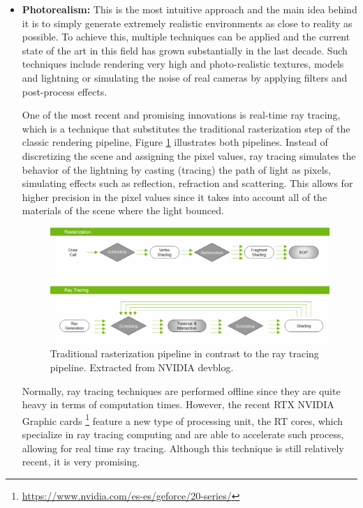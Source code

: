 \begin{itemize}
	\item \textbf{Photorealism:} This is the most intuitive approach and the main idea behind it is to simply generate extremely realistic environments as close to reality as possible. To achieve this, multiple techniques can be applied and the current state of the art in this field has grown substantially in the last decade. Such techniques include rendering very high and photo-realistic textures, models and lightning or simulating the noise of real cameras by applying filters and post-process effects. 
	
	One of the most recent and promising innovations is real-time ray tracing, which is a technique that substitutes the traditional rasterization step of the classic rendering pipeline, Figure \ref{fig:pipeline} illustrates both pipelines. Instead of discretizing the scene and assigning the pixel values, ray tracing simulates the behavior of the lightning by casting (tracing) the path of light as pixels, simulating effects such as reflection, refraction and scattering. This allows for higher precision in the pixel values since it takes into account all of the materials of the scene where the light bounced.
	
	\begin{figure}
		\centering
		\includegraphics[width=\linewidth]{archivos/pipeline}
		\caption[Traditional rasterization pipeline in contrast to the ray tracing pipeline.]{Traditional rasterization pipeline in contrast to the ray tracing pipeline. Extracted from NVIDIA devblog\footnotemark.}
		\label{fig:pipeline}
	\end{figure}
	
	Normally, ray tracing techniques are performed offline since they are quite heavy in terms of computation times. However, the recent RTX NVIDIA Graphic cards \footnote{\url{https://www.nvidia.com/es-es/geforce/20-series/}} feature a new type of processing unit, the RT cores, which specialize in ray tracing computing and are able to accelerate such process, allowing for real time ray tracing. Although this technique is still relatively recent, it is very promising.


\end{itemize}
